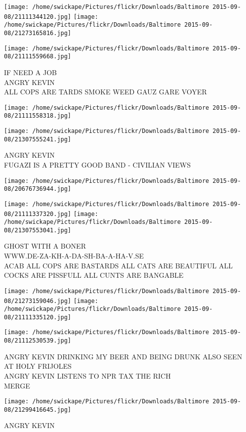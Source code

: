 \documentclass[10pt,letterpaper]{article}
\begin{document}
\texttt{[image: /home/swickape/Pictures/flickr/Downloads/Baltimore 2015-09-08/21111344120.jpg]}
\texttt{[image: /home/swickape/Pictures/flickr/Downloads/Baltimore 2015-09-08/21273165816.jpg]}

\vspace{0.25in}
\texttt{[image: /home/swickape/Pictures/flickr/Downloads/Baltimore 2015-09-08/21111559668.jpg]}

IF NEED A JOB\\
ANGRY KEVIN\\
ALL COPS ARE TARDS SMOKE WEED GAUZ GARE VOYER
\pagebreak

\texttt{[image: /home/swickape/Pictures/flickr/Downloads/Baltimore 2015-09-08/21111558318.jpg]}

\vspace{0.25in}
\texttt{[image: /home/swickape/Pictures/flickr/Downloads/Baltimore 2015-09-08/21307555241.jpg]}

ANGRY KEVIN\\
FUGAZI IS A PRETTY GOOD BAND {-} CIVILIAN VIEWS
\pagebreak

\texttt{[image: /home/swickape/Pictures/flickr/Downloads/Baltimore 2015-09-08/20676736944.jpg]}

\vspace{0.25in}
\texttt{[image: /home/swickape/Pictures/flickr/Downloads/Baltimore 2015-09-08/21111337320.jpg]}
\texttt{[image: /home/swickape/Pictures/flickr/Downloads/Baltimore 2015-09-08/21307553041.jpg]}

GHOST WITH A BONER\\
WWW.DE{-}ZA{-}KH{-}A{-}DA{-}SH{-}BA{-}A{-}HA{-}V.SE\\
ACAB ALL COPS ARE BASTARDS ALL CATS ARE BEAUTIFUL ALL COCKS ARE PISSFULL ALL CUNTS ARE BANGABLE
\pagebreak

\texttt{[image: /home/swickape/Pictures/flickr/Downloads/Baltimore 2015-09-08/21273159046.jpg]}
\texttt{[image: /home/swickape/Pictures/flickr/Downloads/Baltimore 2015-09-08/21111335120.jpg]}

\texttt{[image: /home/swickape/Pictures/flickr/Downloads/Baltimore 2015-09-08/21112530539.jpg]}

ANGRY KEVIN DRINKING MY BEER AND BEING DRUNK ALSO SEEN AT HOLY FRIJOLES\\
ANGRY KEVIN LISTENS TO NPR TAX THE RICH\\
MERGE
\pagebreak

\texttt{[image: /home/swickape/Pictures/flickr/Downloads/Baltimore 2015-09-08/21299416645.jpg]}

ANGRY KEVIN
\pagebreak
\end{document}
